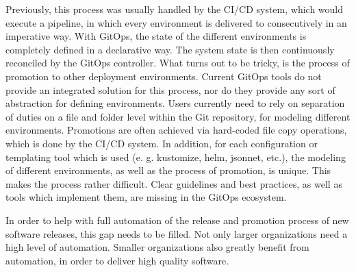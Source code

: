 \noindent
Previously, this process was usually handled by the CI/CD system,
which would execute a pipeline, in which every environment
is delivered to consecutively
in an imperative way.
With GitOps, the state of the different environments
is completely defined
in a declarative way.
The system state is then continuously reconciled
by the GitOps controller.
What turns out to be tricky,
is the process of promotion to other deployment environments.
Current GitOps tools do not provide an integrated solution for this process,
nor do they provide any sort of abstraction for defining environments.
Users currently need to rely on separation of duties
on a file and folder level within the Git repository,
for modeling different environments.
Promotions are often achieved via hard-coded file copy operations,
which is done by the CI/CD system.
In addition, for each configuration or templating tool which is used
(e. g. kustomize, helm, jsonnet, etc.),
the modeling of different environments, as well as the
process of promotion, is unique.
This makes the process rather difficult.
Clear guidelines and best practices,
as well as tools which implement them,
are missing in the GitOps ecosystem.
\bigskip

\noindent
In order to help with full automation of the 
release and promotion process of new software releases,
this gap needs to be filled.
Not only larger organizations need a high level of automation.
Smaller organizations also
greatly benefit from automation, in order
to deliver high quality software.
\bigskip










